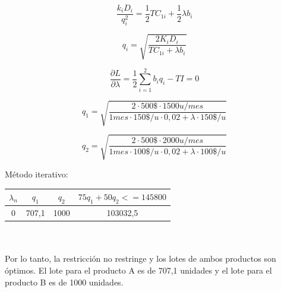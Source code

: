 \documentclass[a4paper,10pt]{article}
\begin{document}
$$ \frac{ k_i D_i}{q_i^2} = \frac{1}{2} T C_{1i} + \frac{1}{2}  \lambda b_i $$

$$ q_i = \sqrt{ \frac{2K_i D_i}{TC_{1i} +  \lambda b_i}} $$

$$\frac{\partial L } {\partial \lambda }   = \frac{1}{2} \sum_{i=1}^{2} b_i q_i - TI = 0$$




$$ q_1 = \sqrt{ \frac{2\cdot 500 \$\cdot 1500 u/mes }{1 mes \cdot 150 \$/u \cdot 0,02 + \lambda \cdot 150\$/u}} $$

$$ q_2 = \sqrt{ \frac{2\cdot 500 \$ \cdot2000 u/mes }{1 mes \cdot 100 \$/u \cdot 0,02 + \lambda  \cdot 100\$/u}} $$

Método iterativo:\\
    \begin{tabular}{|| c | c | c | c ||}
    \hline 
      $\lambda_n$ & $q_1$ & $q_2$ &  	$75 q_1 + 50 q_2 <= 145800 $\\ \hline \hline
     0 & 707,1 & 1000 & 103032,5	\\ \hline

    \end{tabular}
\\ \\ 
Por lo tanto, la restricción no restringe y los lotes de ambos productos son óptimos. El lote para el producto A es de 707,1 unidades y el lote para el producto B es de 1000 unidades.
\end{document}
